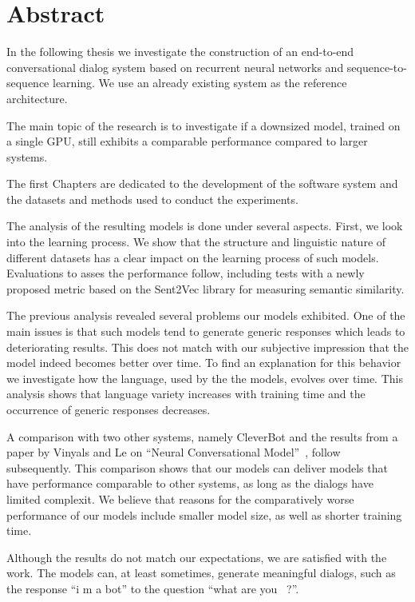 \chapter*{Abstract}
In the following thesis we investigate the construction of an end-to-end conversational dialog system based on recurrent neural networks and sequence-to-sequence learning. We use an already existing system as the reference architecture. 

The main topic of the research is to investigate if a downsized model, trained on a single GPU, still exhibits a comparable performance compared to larger systems.

The first Chapters are dedicated to the development of the software system and the datasets and methods used to conduct the experiments.

The analysis of the resulting models is done under several aspects. First, we look into the learning process. We show that the structure and linguistic nature of different datasets has a clear impact on the learning process of such models. Evaluations to asses the performance follow, including tests with a newly proposed metric based on the Sent2Vec library for measuring semantic similarity.

The previous analysis revealed several problems our models exhibited. One of the main issues is that such models tend to generate generic responses which leads to deteriorating results. This does not match with our subjective impression that the model indeed becomes better over time. To find an explanation for this behavior we investigate how the language, used by the the models, evolves over time. This analysis shows that language variety increases with training time and the occurrence of generic responses decreases.

A comparison with two other systems, namely CleverBot and the results from a paper by Vinyals and Le on ``Neural Conversational Model''~\cite{Vinyals:2015}, follow subsequently. This comparison shows that our models can deliver models that have performance comparable to other systems, as long as the dialogs have limited complexit. We believe that reasons for the comparatively worse performance of our models include smaller model size, as well as shorter training time.

Although the results do not match our expectations, we are satisfied with the work. The models can, at least sometimes, generate meaningful dialogs, such as the response ``i m a bot'' to the question ``what are you~ ?''.

